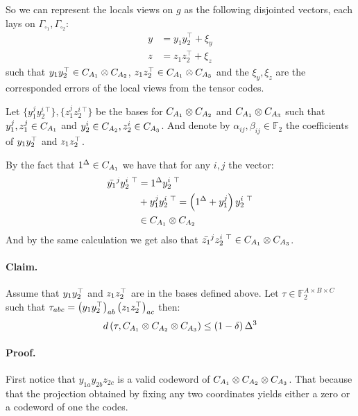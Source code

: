 \documentclass{article}
\begin{document}
\begin{multicols*}{2}
	So we can represent the locals views on $g$ as the following disjointed vectors, each lays on $\Gamma_{\square_1},\Gamma_{\square_2}$:
	\begin{equation*}
	  \begin{split}
	    y &= y_{1}y_{2}^{\top} + \xi_{y} \\ 
	    z &= z_{1}z_{2}^{\top} + \xi_{z}
	  \end{split}
	\end{equation*}
	such that $ y_{1}y_{2}^{\top} \in C_{A_{1}} \otimes C_{A_{2}} $,  $z_{1}z_{2}^{\top}\in C_{A_{1}} \otimes C_{A_{3}} $ and the $\xi_{y}, \xi_{z} $ are the corresponded errors of the local views from the tensor codes. 
 
	Let $ \{ y_{1}^{j}y_{2}^{i \ \top} \} ,\{ z_{1}^{j}z_{2}^{i \ \top} \}  $ be the bases for $ C_{A_{1}} \otimes C_{A_{2}} $ and $ C_{A_{1}} \otimes C_{A_{3}} $ such that $ y_{1}^{j}, z_{1}^{j} \in C_{A_{1}} $ and $ y_{2}^{i} \in C_{A_{2}}, z_{2}^{i} \in C_{A_{3}} $.  
	And denote by $\alpha_{ij},\beta_{ij} \in \mathbb{F}_2 $ the coefficients of $y_{1}y_{2}^{\top}$ and $z_{1}z_{2}^{\top}$. 

	By the fact that $1^\Delta \in C_{A_{1}}$ we have that for any $i,j$ the vector: 
	\begin{equation*}
	  \begin{split}
	  \bar{y_{1}}^{j}y_{2}^{i \ \top} & =  1^\Delta y_{2}^{i \ \top} \\ 
	    & + y_{1}^{j}y_{2}^{i \ \top} = \left(1^\Delta +  y_{1}^{j} \right)y_{2}^{i \ \top} \\
	    & \in C_{A_{1}} \otimes C_{A_{2}}
	  \end{split}
	\end{equation*}
      And by the same calculation we get also that $ \bar{z_{1}}^{j}z_{2}^{i \ \top} \in C_{A_{1}} \otimes C_{A_{3}}$.

      \paragraph{Claim.} Assume that $ y_{1}y_{2}^{\top} $ and $ z_{1}z_{2}^{\top} $ are in the  bases defined above. Let $\tau \in \mathbb{F}_{2}^{A\times B\times C} $ such that $ \tau_{abc} = \left( y_{1}y_{2}^{\top} \right)_{ab}\left( z_{1}z_{2}^{\top} \right)_{ac} $ then: 
      \begin{equation*}	
      d\left( \tau, C_{A_{1}} \otimes C_{A_{2}} \otimes C_{A_{3}} \right) \le \left( 1-\delta \right)\Delta^{3}  
      \end{equation*}
      \paragraph{Proof.} First notice that $y_{1a}y_{2b}z_{2c} $ is a valid codeword of $C_{A_{1}} \otimes C_{A_{2}} \otimes C_{A_{3}}$. That because that the projection obtained by 
      fixing any two coordinates yields either a zero or a codeword of one the codes.
      

\end{multicols*}
\end{document}
